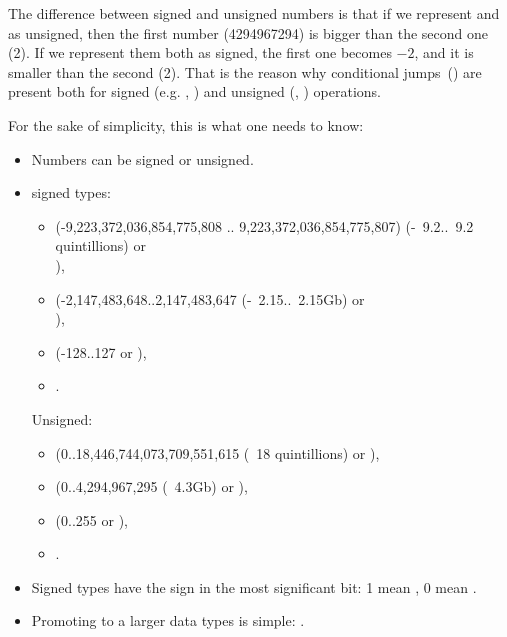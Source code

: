 The difference between signed and unsigned numbers is that if we represent  and  
as unsigned, then the first number (4294967294) is bigger than the second one (2). 
If we represent them both as signed, the first one becomes $-2$, and it is smaller than the second (2). 
That is the reason why conditional jumps~() are present both for signed (e.g. \JG, \JL) 
and unsigned (\JA, \JB) operations.

For the sake of simplicity, this is what one needs to know:

\begin{itemize}
\item Numbers can be signed or unsigned.

\item \CCpp signed types:

  \begin{itemize}
    \item {} (-9,223,372,036,854,775,808 .. 9,223,372,036,854,775,807)
	  (-~9.2..~9.2 quintillions) or \\
                ),
    \item \Tint (-2,147,483,648..2,147,483,647 (-~2.15..~2.15Gb) or \\
	    ),
    \item \Tchar (-128..127 or ),
    \item {}.
   \end{itemize}

	Unsigned:
  \begin{itemize}
	  \item {} (0..18,446,744,073,709,551,615 
		  (~18 quintillions) or ),
   \item {} (0..4,294,967,295 (~4.3Gb) or ),
   \item {} (0..255 or ), 
   \item {}.
  \end{itemize}

\item Signed types have the sign in the most significant bit: 1 mean , 0 mean .

\item Promoting to a larger data types is simple:
.


\end{itemize}
